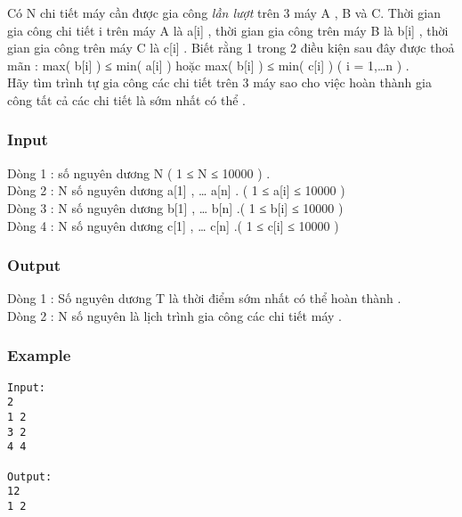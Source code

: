 



   Có N chi tiết máy cần được gia công   \textit{    lần lượt   }   trên 3 máy A , B và C. Thời gian gia công chi tiết i trên máy A là  a[i] , thời gian gia công trên máy B là b[i] , thời gian gia công trên máy C là c[i] . Biết rằng 1 trong 2 điều kiện sau đây được thoả mãn : max( b[i] ) ≤ min( a[i] ) hoặc max( b[i] ) ≤ min( c[i] ) ( i = 1,…n ) .   
\\   Hãy tìm trình tự gia công các chi tiết trên 3 máy sao cho việc hoàn thành gia công tất cả các chi tiết là sớm nhất có thể .  

\subsubsection{   Input  }

   Dòng 1 : số nguyên dương N ( 1 ≤ N ≤ 10000 ) .   
\\   Dòng 2 : N số nguyên dương a[1] , … a[n] . ( 1 ≤ a[i] ≤ 10000 )   
\\   Dòng 3 : N số nguyên dương b[1] , … b[n] .( 1 ≤ b[i] ≤ 10000 )   
\\   Dòng 4 : N số nguyên dương c[1] , … c[n] .( 1 ≤ c[i] ≤ 10000 )  

\subsubsection{   Output  }

   Dòng 1 : Số nguyên dương T là thời điểm sớm nhất có thể hoàn thành .   
\\   Dòng 2 : N số nguyên là lịch trình gia công các chi tiết máy .  

\subsubsection{   Example  }
\begin{verbatim}
Input:
2
1 2
3 2
4 4

Output:
12
1 2
\end{verbatim}